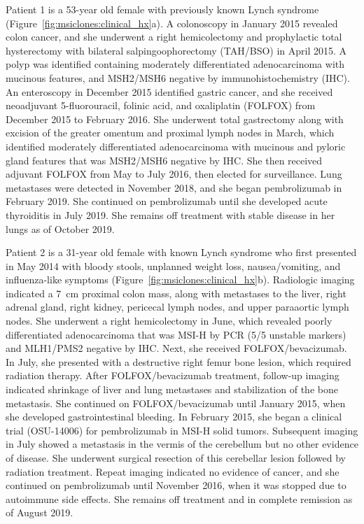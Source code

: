 Patient 1 is a 53-year old female with previously known Lynch syndrome (Figure~\ref{fig:msiclones:clinical_hx}a). A colonoscopy in January 2015 revealed colon cancer, and she underwent a right hemicolectomy and prophylactic total hysterectomy with bilateral salpingoophorectomy (TAH/BSO) in April 2015. A polyp was identified containing moderately differentiated adenocarcinoma with mucinous features, and MSH2/MSH6 negative by immunohistochemistry (IHC)\@. An enteroscopy in December 2015 identified gastric cancer, and she received neoadjuvant 5\nobreakdash-fluorouracil, folinic acid, and oxaliplatin (FOLFOX) from December 2015 to February 2016. She underwent total gastrectomy along with excision of the greater omentum and proximal lymph nodes in March, which identified moderately differentiated adenocarcinoma with mucinous and pyloric gland features that was MSH2/MSH6 negative by IHC\@. She then received adjuvant FOLFOX from May to July 2016, then elected for surveillance. Lung metastases were detected in November 2018, and she began pembrolizumab in February 2019. She continued on pembrolizumab until she developed acute thyroiditis in July 2019. She remains off treatment with stable disease in her lungs as of October 2019.

Patient 2 is a 31-year old female with known Lynch syndrome who first presented in May 2014 with bloody stools, unplanned weight loss, nausea\slash{}vomiting, and influenza-like symptoms (Figure~\ref{fig:msiclones:clinical_hx}b). Radiologic imaging indicated a 7~cm proximal colon mass, along with metastases to the liver, right adrenal gland, right kidney, pericecal lymph nodes, and upper paraaortic lymph nodes. She underwent a right hemicolectomy in June, which revealed poorly differentiated adenocarcinoma that was MSI-H by PCR (5/5 unstable markers) and MLH1/PMS2 negative by IHC\@. Next, she received FOLFOX\slash{}bevacizumab. In July, she presented with a destructive right femur bone lesion, which required radiation therapy. After FOLFOX\slash{}bevacizumab treatment, follow-up imaging indicated shrinkage of liver and lung metastases and stabilization of the bone metastasis. She continued on FOLFOX\slash{}bevacizumab until January 2015, when she developed gastrointestinal bleeding. In February 2015, she began a clinical trial (OSU-14006) for pembrolizumab in MSI-H solid tumors. Subsequent imaging in July showed a metastasis in the vermis of the cerebellum but no other evidence of disease. She underwent surgical resection of this cerebellar lesion followed by radiation treatment. Repeat imaging indicated no evidence of cancer, and she continued on pembrolizumab until November 2016, when it was stopped due to autoimmune side effects. She remains off treatment and in complete remission as of August 2019.


